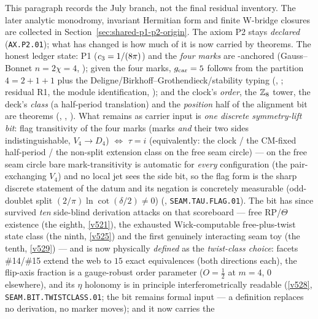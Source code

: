 \begin{keybox}
This paragraph records the July branch, not the final residual inventory. The later
analytic monodromy, invariant Hermitian form and finite W-bridge closures are collected
in Section~\ref{sec:shared-p1-p2-origin}. The axiom P2 stays \emph{declared}
(\texttt{AX.P2.01}); what has changed is how much of it is now
carried by theorems. The honest ledger state: P1 ($c_3=1/(8\pi)$) and the \emph{four marks} are
\mE-anchored (Gauss--Bonnet $n=2\chi=4$, ); given the four marks,
$g_{\mathrm{car}}=5$ follows from the partition $4=2{+}1{+}1$ plus the Deligne/Birkhoff--Grothendieck/stability
typing (, ; residual
R1, the module identification, \mC); and the clock's \emph{order}, the $\mathbb{Z}_8$ tower, the deck's
\emph{class} (a half-period translation) and the \emph{position} half of the alignment bit are
theorems (, ,
). What remains as carrier input is \emph{one discrete
symmetry-lift bit}: flag transitivity of the four marks (marks \emph{and} their two sides
indistinguishable, $V_4\to D_4$) $\iff$ $\tau=i$ (equivalently: the clock / the CM-fixed
half-period / the non-split extension class on the free seam circle) --- on the free seam circle
bare mark-transitivity is automatic for \emph{every} configuration (the pair-exchanging $V_4$) and
no local jet sees the side bit, so the flag form is the sharp discrete statement of the datum and
its negation is concretely measurable (odd-doublet split $(2/\pi)\ln\cot(\delta/2)\neq0$)
(, \texttt{SEAM.TAU.FLAG.01}). The bit has since survived
\emph{ten} side-blind derivation attacks on that scoreboard --- free RP/$\Theta$ existence (the
eighth, \vref{v521}), the exhausted Wick-computable free-plus-twist state class (the ninth,
\vref{v525}) and the first genuinely interacting seam toy (the tenth, \vref{v529}) --- and is now
physically \emph{defined} as the \emph{twist-class choice}: facets \#14/\#15 extend the web to
$15$ exact equivalences (both directions each), the flip-axis fraction is a gauge-robust order
parameter ($O=\tfrac12$ at $m=4$, $0$ elsewhere), and its $\eta$ holonomy is in principle
interferometrically readable (\vref{v528}, \texttt{SEAM.BIT.TWISTCLASS.01}; the bit remains
formal input --- a definition replaces no derivation, no marker moves); and it now carries the

\end{keybox}
